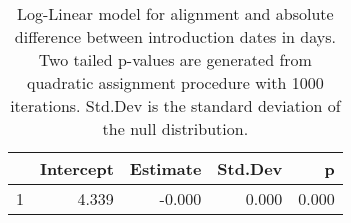 \begin{table}[ht]
\centering
\begin{tabular}{rrrrr}
  \hline
 & Intercept & Estimate & Std.Dev & p \\ 
  \hline
1 & 4.339 & -0.000 & 0.000 & 0.000 \\ 
   \hline
\end{tabular}
\caption{Log-Linear model for alignment and absolute
difference between introduction dates in days. Two tailed p-values are
generated from quadratic assignment procedure with 1000 iterations.
Std.Dev is the standard deviation of the null distribution.} 
\label{tab:time_diff_reg}
\end{table}
